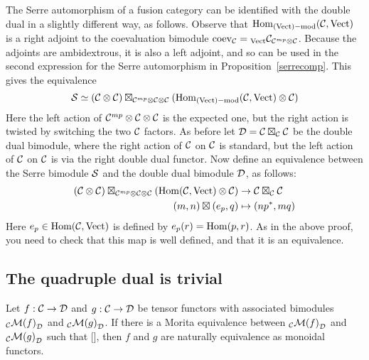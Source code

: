 \documentclass{amsart}
\begin{document}
\begin{remark}
The Serre automorphism of a fusion category can be identified with the double dual in a slightly different way, as follows.  Observe that $\operatorname{Hom}_{(\mathrm{Vect})-\mathrm{mod}}(\mathcal C,\mathrm{Vect})$ is a right adjoint to the coevaluation bimodule $\mathrm{coev}_{\mathcal C} = {}_{\mathrm{Vect}} {\mathcal C}_{\mathcal C^{mp} \otimes \mathcal C}$.    Because the adjoints are ambidextrous, it is also a left adjoint, and so can be used in the second expression for the Serre automorphism in Proposition~\ref{serrecomp}.  This gives the equivalence
\begin{equation} \nonumber
\mathcal S \simeq (\mathcal C \otimes \mathcal C) \boxtimes_{\mathcal C^{mp} \otimes \mathcal C \otimes \mathcal C} (\operatorname{Hom}_{(\mathrm{Vect})-\mathrm{mod}}(\mathcal C,\mathrm{Vect}) \otimes \mathcal C)
\end{equation}
Here the left action of $\mathcal C^{mp} \otimes \mathcal C \otimes \mathcal C$ is the expected one, but the right action is twisted by switching the two $\mathcal C$ factors.  As before let $\mathcal D = \mathcal C \boxtimes_{\mathcal C} \mathcal C$ be the double dual bimodule, where the right action of $\mathcal C$ on $\mathcal C$ is standard, but the left action of $\mathcal C$ on $\mathcal C$ is via the right double dual functor.  Now define an equivalence between the Serre bimodule $\mathcal S$ and the double dual bimodule $\mathcal D$, as follows:
\begin{align}
(\mathcal C \otimes \mathcal C) \boxtimes_{\mathcal C^{mp} \otimes \mathcal C \otimes \mathcal C} (\operatorname{Hom}(\mathcal C,\mathrm{Vect}) \otimes \mathcal C) & \rightarrow \mathcal C \boxtimes_{\mathcal C} \mathcal C \nonumber\\
(m, n) \boxtimes (e_p, q) & \mapsto (n {p}^*, mq)
\end{align}
Here $e_p \in \operatorname{Hom}(\mathcal C,\mathrm{Vect})$ is defined by $e_p(r) = \operatorname{Hom}(p,r)$.  As in the above proof, you need to check that this map is well defined, and that it is an equivalence.
\end{remark}

\subsection{The quadruple dual is trivial} \label{sec-serre-quad}

\begin{lemma}
Let $f: \mathcal C \rightarrow \mathcal D$ and $g: \mathcal C \rightarrow \mathcal D$ be tensor functors with associated bimodules ${}_{\mathcal C} {\mathcal M(f)}_{\mathcal D}$ and ${}_{\mathcal C} {\mathcal M(g)}_{\mathcal D}$.  If there is a Morita equivalence between ${}_{\mathcal C} {\mathcal M(f)}_{\mathcal D}$ and ${}_{\mathcal C} {\mathcal M(g)}_{\mathcal D}$ such that [], then $f$ and $g$ are naturally equivalence as monoidal functors.
\end{lemma}
\end{document}
